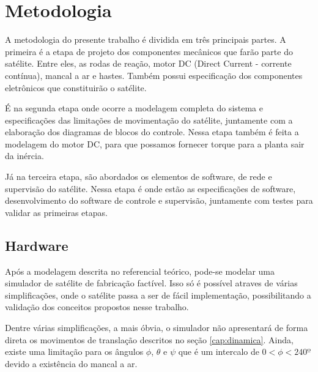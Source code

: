 \chapter{Metodologia}

A metodologia do presente trabalho é dividida em três principais partes. A primeira é a etapa de projeto dos componentes mecânicos que farão parte do satélite. Entre eles, as rodas de reação, motor DC (Direct Current - corrente contínua), mancal a ar e hastes. Também possui especificação dos componentes eletrônicos que constituirão o satélite.

É na segunda etapa onde ocorre a modelagem completa do sistema e especificações das limitações de movimentação do satélite, juntamente com a elaboração dos diagramas de blocos do controle. Nessa etapa também é feita a modelagem do motor DC, para que possamos fornecer torque para a planta sair da inércia.

Já na terceira etapa, são abordados os elementos de software, de rede e supervisão do satélite. Nessa etapa é onde estão as especificações de software, desenvolvimento do software de controle e supervisão, juntamente com testes para validar as primeiras etapas.

\section{Hardware}

Após a modelagem descrita no referencial teórico, pode-se modelar uma simulador de satélite de fabricação factível. Isso só é possível atraves de várias simplificações, onde o satélite passa a ser de fácil implementação, possibilitando a validação dos conceitos propostos nesse trabalho.

Dentre várias simplificações, a mais óbvia, o simulador não apresentará de forma direta os movimentos de translação descritos no seção \ref{cap:dinamica}. Ainda, existe uma limitação para os ângulos $\phi$, $\theta$ e $\psi$ que é um intercalo de $0<\phi<240º$ devido a existência do mancal a ar.


